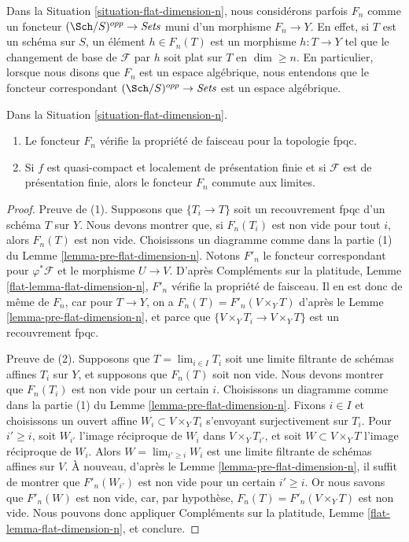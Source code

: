 \noindent
Dans la Situation \ref{situation-flat-dimension-n}, nous considérons parfois
$F_n$ comme un foncteur $(\Sch/S)^{opp} \to \textit{Sets}$ muni d'un morphisme
$F_n \to Y$. En effet, si $T$ est un schéma sur $S$,
un élément $h \in F_n(T)$ est un morphisme $h : T \to Y$
tel que le changement de base de $\mathcal{F}$ par $h$ soit plat sur $T$
en $\dim \geq n$. En particulier, lorsque nous disons
que $F_n$ est un espace algébrique, nous entendons que le foncteur
correspondant $(\Sch/S)^{opp} \to \textit{Sets}$ est un espace algébrique.

\begin{lemma}
\label{lemma-flat-dimension-n}
Dans la Situation \ref{situation-flat-dimension-n}.
\begin{enumerate}
\item Le foncteur $F_n$ vérifie la propriété de faisceau pour la topologie fpqc.
\item Si $f$ est quasi-compact et localement de présentation finie
et si $\mathcal{F}$ est de présentation finie, alors le foncteur $F_n$
commute aux limites.
\end{enumerate}
\end{lemma}

\begin{proof}
Preuve de (1). Supposons que $\{T_i \to T\}$ soit un recouvrement fpqc
d'un schéma $T$ sur $Y$. Nous devons montrer que, si $F_n(T_i)$ est non vide
pour tout $i$, alors $F_n(T)$ est non vide.
Choisissons un diagramme comme dans la partie (1) du Lemme \ref{lemma-pre-flat-dimension-n}.
Notons $F'_n$ le foncteur correspondant pour
$\varphi^*\mathcal{F}$ et le morphisme $U \to V$.
D'après Compléments sur la platitude, Lemme \ref{flat-lemma-flat-dimension-n},
$F'_n$ vérifie la propriété de faisceau.
Il en est donc de même de $F_n$, car
pour $T \to Y$, on a $F_n(T) = F'_n(V \times_Y T)$
d'après le Lemme \ref{lemma-pre-flat-dimension-n},
et parce que $\{V \times_Y T_i \to V \times_Y T\}$
est un recouvrement fpqc.

\medskip\noindent
Preuve de (2). Supposons que $T = \lim_{i \in I} T_i$ soit une limite filtrante
de schémas affines $T_i$ sur $Y$, et supposons que $F_n(T)$ soit non vide.
Nous devons montrer que $F_n(T_i)$ est non vide pour un certain $i$.
Choisissons un diagramme comme dans la
partie (1) du Lemme \ref{lemma-pre-flat-dimension-n}.
Fixons $i \in I$ et choisissons un ouvert affine $W_i \subset V \times_Y T_i$
s'envoyant surjectivement sur $T_i$. Pour $i' \geq i$, soit $W_{i'}$
l'image réciproque de $W_i$ dans $V \times_Y T_{i'}$, et
soit $W \subset V \times_Y T$ l'image réciproque de $W_i$.
Alors $W = \lim_{i' \geq i} W_i$ est une limite filtrante de schémas
affines sur $V$. À nouveau, d'après le
Lemme \ref{lemma-pre-flat-dimension-n},
il suffit de montrer que $F'_n(W_{i'})$ est non vide pour un certain
$i' \geq i$. Or nous savons que $F'_n(W)$ est non vide,
car, par hypothèse, $F_n(T) = F'_n(V \times_Y T)$
est non vide. Nous pouvons donc appliquer
Compléments sur la platitude, Lemme \ref{flat-lemma-flat-dimension-n},
et conclure.
\end{proof}

